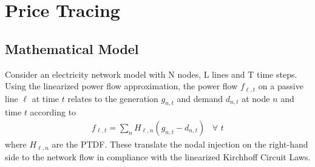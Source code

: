 \documentclass[11pt,twocolumn]{article}
\newcommand{\Forall}[1]{\hspace{10pt} \forall \,\, #1 }
\newcommand{\nodalgeneration}[1][n]{g_{#1,t}}
\newcommand{\flow}{f_{\ell,t}}
\newcommand{\demand}[1][n]{d_{#1,t}}
\newcommand{\ptdf}[1][n]{H_{\ell,#1}}
\begin{document}
\section{Price Tracing}
\label{sec:price_tracing}

\subsection{Mathematical Model}

Consider an electricity network model with N nodes, L lines and T time steps. Using the linearized power flow approximation, the power flow $\flow$ on a passive line $\ell$ at time $t$ relates to the generation $\nodalgeneration$ and demand $\demand$ at node $n$ and time $t$ according to 
\begin{align}
    \flow = \sum_n \ptdf \left(\nodalgeneration - \demand \right) \Forall{t}
\end{align}
where $\ptdf$ are the \ac{PTDF}. These translate the nodal injection on the right-hand side to the network flow in compliance with the linearized Kirchhoff Circuit Laws. 
\end{document}
